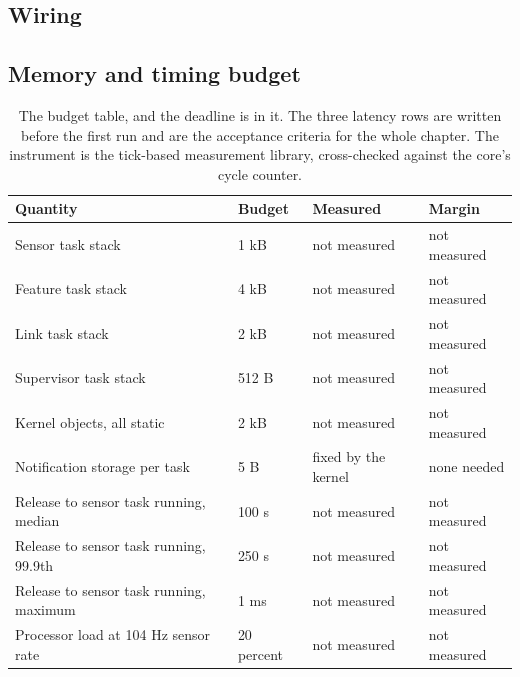 \subsection*{Wiring}


\subsection*{Memory and timing budget}


\begin{table}[H]\centering\small
\begin{tabular}{p{44mm}p{28mm}p{28mm}p{30mm}}
\toprule
Quantity & Budget & Measured & Margin \\
\midrule
Sensor task stack & 1 kB & not measured & not measured \\
Feature task stack & 4 kB & not measured & not measured \\
Link task stack & 2 kB & not measured & not measured \\
Supervisor task stack & 512 B & not measured & not measured \\
Kernel objects, all static & 2 kB & not measured & not measured \\
Notification storage per task & 5 B & fixed by the kernel & none needed \\
Release to sensor task running, median & 100 \textmu{}s & not measured & not measured \\
Release to sensor task running, 99.9th & 250 \textmu{}s & not measured & not measured \\
Release to sensor task running, maximum & 1 ms & not measured & not measured \\
Processor load at 104 Hz sensor rate & 20 percent & not measured & not measured \\
\bottomrule
\end{tabular}
\caption{The budget table, and the deadline is in it. The three latency rows are written before the first run and are the acceptance criteria for the whole chapter. The instrument is the tick-based measurement library, cross-checked against the core's cycle counter.}
\end{table}

